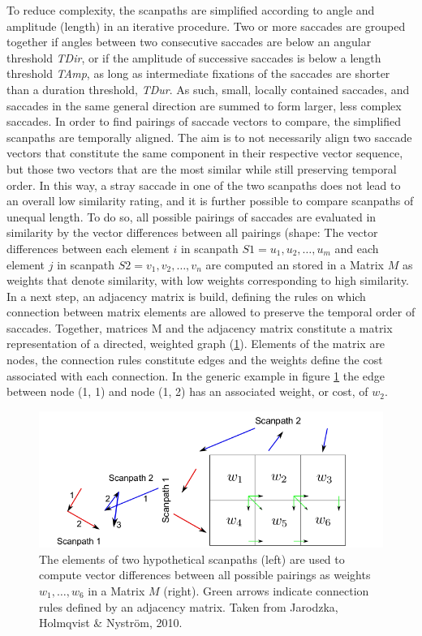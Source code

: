 \documentclass[a4paper, 11pt]{scrreprt}
\begin{document}
To reduce complexity, the scanpaths are simplified according to angle and amplitude (length) in an iterative procedure. Two or more saccades are grouped together if angles between two consecutive saccades are below an angular threshold \textit{TDir}, or if the amplitude of successive saccades is below a length threshold \textit{TAmp}, as long as intermediate fixations of the saccades are shorter than a duration threshold, \textit{TDur}. As such, small, locally contained saccades, and saccades in the same general direction are summed to form larger, less complex saccades. \newline
In order to find pairings of saccade vectors to compare, the simplified scanpaths are temporally aligned. The aim is to not necessarily align two saccade vectors that constitute the same component in  their respective vector sequence, but those two vectors that are the most similar while still preserving temporal order. In this way, a stray saccade in one of the two scanpaths does not lead to an overall low similarity rating, and it is further possible to compare scanpaths of unequal length.  To do so, all possible pairings of saccades are evaluated in similarity by the vector differences between all pairings (shape: The vector differences between each element $i$ in scanpath $S1 = {u_1, u_2, \ldots, u_m}$ and each element $j$ in scanpath $S2 = {v_1, v_2, \ldots, v_n}$ are computed an stored in a Matrix $M$ as weights that denote similarity, with low weights corresponding to high similarity. In a next step, an adjacency matrix is build, defining the rules on which connection between matrix elements are allowed to preserve the temporal order of saccades. Together, matrices M and the adjacency matrix constitute a matrix representation of a directed, weighted graph (\ref{fig:directedgraph}). Elements of the matrix are nodes, the connection rules constitute edges and the weights define the cost associated with each connection. 
In the generic example in figure \ref{fig:directedgraph} the edge between node (1, 1) and node (1, 2) has an associated weight, or cost, of $w_2$. 


\begin{figure}
	\includegraphics[scale=0.4]{img/weightedgraph.png}
	\caption[Scanpath alignment as a shortest-path-problem]
	{\small{The elements of two hypothetical scanpaths (left) are used to compute vector differences between all possible pairings as weights $w_1, \ldots, w_6$ in a Matrix $M$ (right). Green arrows indicate connection rules defined by an adjacency matrix. Taken from Jarodzka, Holmqvist \& Nyström, 2010.}}
	\label{fig:directedgraph}
\end{figure}
\end{document}

